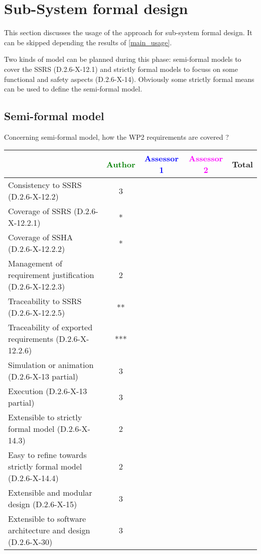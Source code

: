 \section{Sub-System formal design}
This section discusses the usage of the approach for sub-system formal design.
It can be skipped depending the results of \ref{main_usage}.

Two kinds of model can be planned during this phase: semi-formal models to  cover the SSRS (D.2.6-X-12.1) and strictly formal  models to  focuss on some functional and safety aspects (D.2.6-X-14).  Obviously some strictly  formal means can be used to define the semi-formal  model.

\subsection{Semi-formal model}

Concerning semi-formal model, how the WP2 requirements are covered ?

\begin{tabular}{|l | c | c | c | c|}
\hline
& \textcolor{green}{Author} & \textcolor{blue}{Assessor 1} & \textcolor{magenta}{Assessor 2} & Total \\
\hline 
Consistency to SSRS (D.2.6-X-12.2) &3 & & &  \\
\hline
Coverage of SSRS (D.2.6-X-12.2.1)  &* & & &  \\
\hline
Coverage of SSHA (D.2.6-X-12.2.2)  &* & & &  \\
\hline
Management of requirement justification (D.2.6-X-12.2.3)  &2 & & &  \\
\hline
Traceability to  SSRS (D.2.6-X-12.2.5)  &** & & &  \\
\hline
Traceability of exported requirements (D.2.6-X-12.2.6)  &*** & & &  \\
\hline
Simulation or animation (D.2.6-X-13 partial)  &3 & & &  \\
\hline
Execution (D.2.6-X-13 partial)  &3 & & &  \\
\hline
Extensible to strictly formal model (D.2.6-X-14.3) &2 & & &  \\
\hline
Easy to  refine towards strictly formal model (D.2.6-X-14.4) &2 & & &  \\
\hline
Extensible and modular design (D.2.6-X-15)  &3 & & &  \\
\hline
Extensible to software architecture and design (D.2.6-X-30)   &3 & & &  \\
\hline
\end{tabular}

